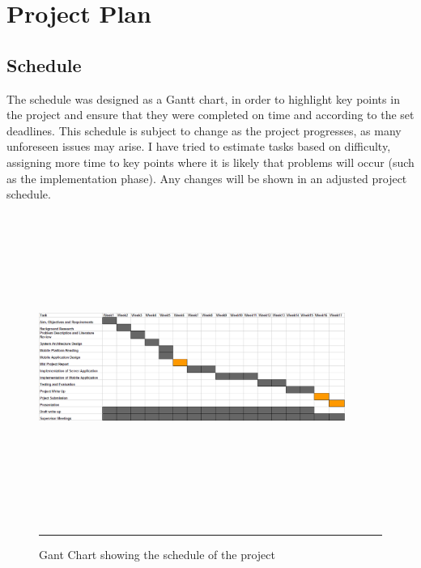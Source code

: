 
\chapter{Project Plan} %

\label{Chapter2} %



\section{Schedule}

The schedule was designed as a Gantt chart, in order to highlight key points in the project and ensure that they were completed on time and according to the set deadlines. This schedule is subject to change as the project progresses, as many unforeseen issues may arise. I have tried to estimate tasks based on difficulty, assigning more time to key points where it is likely that problems will occur (such as the implementation phase). Any changes will be shown in an adjusted project schedule.

\begin{figure}[htbp]
	\centering
\includegraphics[width=10cm,height=10cm,keepaspectratio]{Figures/projectgant.png}
		\rule{35em}{0.5pt}
	\caption[Gantt Chart showing the schedule of the project]{Gant Chart showing the schedule of the project}
	\label{fig:projectgant}
\end{figure}

